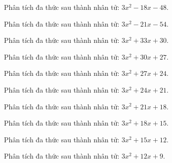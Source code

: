 \begin{bt}
	Phân tích đa thức sau thành nhân tử: $3 x^2 - 18 x - 48$.
\end{bt}
\begin{bt}
	Phân tích đa thức sau thành nhân tử: $3 x^2 - 21 x - 54$.
\end{bt}
\begin{bt}
	Phân tích đa thức sau thành nhân tử: $3 x^2 + 33 x + 30$.
\end{bt}
\begin{bt}
	Phân tích đa thức sau thành nhân tử: $3 x^2 + 30 x + 27$.
\end{bt}
\begin{bt}
	Phân tích đa thức sau thành nhân tử: $3 x^2 + 27 x + 24$.
\end{bt}
\begin{bt}
	Phân tích đa thức sau thành nhân tử: $3 x^2 + 24 x + 21$.
\end{bt}
\begin{bt}
	Phân tích đa thức sau thành nhân tử: $3 x^2 + 21 x + 18$.
\end{bt}
\begin{bt}
	Phân tích đa thức sau thành nhân tử: $3 x^2 + 18 x + 15$.
\end{bt}
\begin{bt}
	Phân tích đa thức sau thành nhân tử: $3 x^2 + 15 x + 12$.
\end{bt}
\begin{bt}
	Phân tích đa thức sau thành nhân tử: $3 x^2 + 12 x + 9$.
\end{bt}
